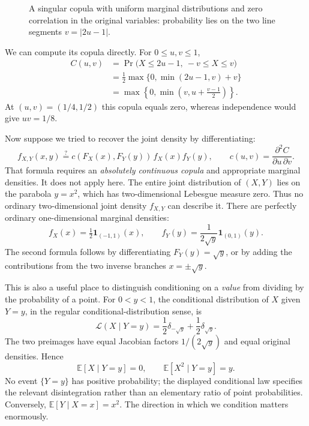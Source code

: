 \begin{figure}[htbp]
\centering
{}
\caption{A singular copula with uniform marginal distributions and zero correlation in the original variables: probability lies on the two line segments \(v=|2u-1|\).}
\label{fig:N20261105-Vshape}
\end{figure}

We can compute its copula directly. For \(0\leq u,v\leq1\),
\begin{align*}
 C(u,v)
 &=\Pr\bigl(X\leq2u-1,\ -v\leq X\leq v\bigr)\\
 &=\frac12\max\{0,\min(2u-1,v)+v\}\\
 &=\boxed{\max\left\{0,\min\left(v,u+\frac{v-1}{2}\right)\right\}}.
\end{align*}
At \((u,v)=(1/4,1/2)\) this copula equals zero, whereas independence would give \(uv=1/8\).

Now suppose we tried to recover the joint density by differentiating:
\[
 f_{X,Y}(x,y)\stackrel{?}{=}
 c(F_X(x),F_Y(y))\,f_X(x)f_Y(y),
 \qquad
 c(u,v)=\frac{\partial^2C}{\partial u\,\partial v}.
\]
That formula requires an \emph{absolutely continuous copula} and appropriate marginal densities. It does not apply here. The entire joint distribution of \((X,Y)\) lies on the parabola \(y=x^2\), which has two-dimensional Lebesgue measure zero. Thus no ordinary two-dimensional joint density \(f_{X,Y}\) can describe it. There are perfectly ordinary one-dimensional marginal densities:
\[
 f_X(x)=\tfrac12\mathbf1_{(-1,1)}(x),\qquad
 f_Y(y)=\frac{1}{2\sqrt y}\mathbf1_{(0,1)}(y).
\]
The second formula follows by differentiating \(F_Y(y)=\sqrt y\), or by adding the contributions from the two inverse branches \(x=\pm\sqrt y\).

This is also a useful place to distinguish conditioning on a \emph{value} from dividing by the probability of a point. For \(0<y<1\), the conditional distribution of \(X\) given \(Y=y\), in the regular conditional-distribution sense, is
\begin{equation}
 \mathcal L(X\mid Y=y)
 =\frac12\delta_{-\sqrt y}+\frac12\delta_{\sqrt y}.
 \label{eq:N20261105-conditional}
\end{equation}
The two preimages have equal Jacobian factors \(1/(2\sqrt y)\) and equal original densities. Hence
\[
 \mathbb E[X\mid Y=y]=0,\qquad
 \mathbb E[X^2\mid Y=y]=y.
\]
No event \(\{Y=y\}\) has positive probability; the displayed conditional law specifies the relevant disintegration rather than an elementary ratio of point probabilities. Conversely, \(\mathbb E[Y\mid X=x]=x^2\). The direction in which we condition matters enormously.

